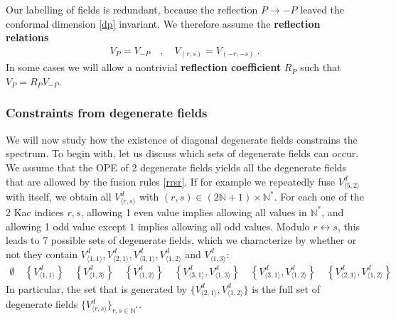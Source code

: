 \documentclass[12pt, a4paper]{article}
\newcommand{\myindex}[1]{\textbf{\boldmath #1}}
\theoremstyle{break}
\begin{document}
Our labelling of fields is redundant, because the reflection $P\to -P$ leaved the conformal dimension \eqref{dp} invariant. We therefore assume the \myindex{reflection relations}
\begin{align}
 V_{P} = V_{-P} \quad , \quad V_{(r,s)} = V_{(-r,-s)} \ . 
 \label{refl}
\end{align}
In some cases we will allow a nontrivial \myindex{reflection coefficient} $R_P$ such that $V_P=R_P V_{-P}$. 


\subsubsection{Constraints from degenerate fields}\label{sec:dotc}

We will now study how the existence of diagonal degenerate fields constrains the spectrum. To begin with, let us discuss which sets of degenerate fields can occur.
We assume that the OPE of 2 degenerate fields yields all the degenerate fields that are allowed by the fusion rules \eqref{rrsr}. 
If for example we repeatedly fuse $V^d_{\langle 5,2\rangle}$ with itself, we obtain all $V^d_{\langle r,s\rangle}$ with $(r,s)\in (2\mathbb{N}+1)\times \mathbb{N}^*$. For each one of the 2 Kac indices $r,s$, allowing 1 even value implies allowing all values in $\mathbb{N}^*$, and allowing 1 odd value except $1$ implies allowing all odd values. Modulo $r\leftrightarrow s$, this leads to 7 possible sets of degenerate fields, which we characterize by whether or not they contain $V^d_{\langle 1,1\rangle}, V^d_{\langle 2,1\rangle},V^d_{\langle 3,1\rangle},V^d_{\langle 1,2\rangle}$ and $V^d_{\langle 1,3\rangle}$:
\begin{align}
  \emptyset \quad \left\{V^d_{\langle 1,1\rangle}\right\}  \quad \left\{V^d_{\langle 1,3\rangle}\right\} \quad \left\{V^d_{\langle 1,2\rangle}\right\} 
  \quad 
  \left\{V^d_{\langle 3,1\rangle},V^d_{\langle 1,3\rangle}\right\} \quad 
  \left\{V^d_{\langle 3,1\rangle},V^d_{\langle 1,2\rangle}\right\} \quad 
  \left\{V^d_{\langle 2,1\rangle},V^d_{\langle 1,2\rangle}\right\} 
 \label{degsets}
\end{align}
In particular, the set that is generated by $\{V^d_{\langle 2,1\rangle},V^d_{\langle 1,2\rangle}\} $ is the full set of degenerate fields $\{V^d_{\langle r,s\rangle}\}_{r,s\in\mathbb{N}^*}$. 
\end{document}
